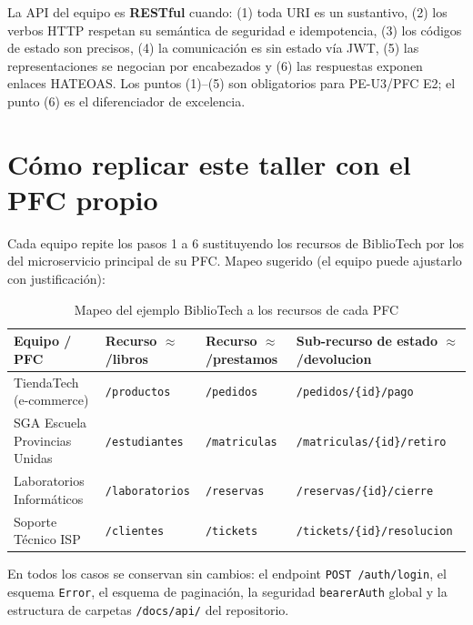 \documentclass[11pt,a4paper]{article}
\begin{document}
\begin{cajanota}
La API del equipo es \textbf{RESTful} cuando: (1) toda URI es un sustantivo, (2) los verbos HTTP respetan su semántica de seguridad e idempotencia, (3) los códigos de estado son precisos, (4) la comunicación es sin estado vía JWT, (5) las representaciones se negocian por encabezados y (6) las respuestas exponen enlaces HATEOAS. Los puntos (1)--(5) son obligatorios para PE-U3/PFC E2; el punto (6) es el diferenciador de excelencia.
\end{cajanota}

\section{Cómo replicar este taller con el PFC propio}\label{sec:replica}

Cada equipo repite los pasos 1 a 6 sustituyendo los recursos de BiblioTech por los del microservicio principal de su PFC. Mapeo sugerido (el equipo puede ajustarlo con justificación):

\begin{table}[h!]
\centering
\caption{Mapeo del ejemplo BiblioTech a los recursos de cada PFC}
\small
\begin{tabular}{p{3.6cm} p{3.2cm} p{3.4cm} p{4.4cm}}
\toprule
\textbf{Equipo / PFC} & \textbf{Recurso $\approx$ /libros} & \textbf{Recurso $\approx$ /prestamos} & \textbf{Sub-recurso de estado $\approx$ /devolucion} \\
\midrule
TiendaTech (e-commerce) & \texttt{/productos} & \texttt{/pedidos} & \texttt{/pedidos/\{id\}/pago} \\
SGA Escuela Provincias Unidas & \texttt{/estudiantes} & \texttt{/matriculas} & \texttt{/matriculas/\{id\}/retiro} \\
Laboratorios Informáticos & \texttt{/laboratorios} & \texttt{/reservas} & \texttt{/reservas/\{id\}/cierre} \\
Soporte Técnico ISP & \texttt{/clientes} & \texttt{/tickets} & \texttt{/tickets/\{id\}/resolucion} \\
\bottomrule
\end{tabular}
\end{table}

En todos los casos se conservan sin cambios: el endpoint \texttt{POST /auth/login}, el esquema \texttt{Error}, el esquema de paginación, la seguridad \texttt{bearerAuth} global y la estructura de carpetas \texttt{/docs/api/} del repositorio.
\end{document}
